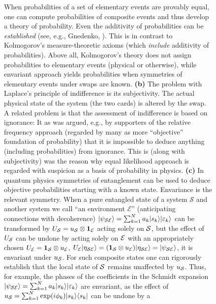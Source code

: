 \documentclass[aps,amsmath,amssymb,amsfonts,floatfix]{revtex4-1}
\newcommand{\cS}        {{\mathcal S}}
\newcommand{\cE}        {{\mathcal E}}
\newcommand{\+}         {\dagger}
\begin{document}
{\begin{figure}[htb]
{When probabilities of a set of elementary events are provably equal, one
can compute probabilities of composite events and thus develop a theory of probability. Even the
additivity of probabilities can be {\it established} (see, e.g., Gnedenko, \cite{32}).
This is in contrast to Kolmogorov's measure-theoretic
axioms (which {\it include} additivity of probabilities). Above all, Kolmogorov's theory does not assign probabilities to elementary events (physical or otherwise), while envariant approach yields probabilities when symmetries of elementary events under swaps are known. 
{\bf (b)} The problem with Laplace's principle of indifference is its subjectivity.
The actual physical state of the system (the two cards) is altered by
the swap.  A related problem is that the assessment of indifference is based on ignorance: It
as was argued, e.g., by supporters of the relative frequency approach (regarded by many as more ``objective'' foundation of probability) that it is impossible to deduce anything 
(including probabilities) from ignorance. This is (along with subjectivity) was the reason why equal likelihood approach
is regarded with suspicion as a basis of probability in physics.
{\bf (c)} In quantum physics symmetries of entanglement can be used to deduce objective
probabilities starting with a known state. Envariance is the relevant symmetry.
When a pure entangled state of a system $\cS$ and another system we call ``an environment $\cE$'' (anticipating connections with decoherence) $
|\psi_{\cal SE}\rangle = \sum_{k=1}^N a_k |s_k\rangle |\varepsilon_k\rangle $ can be transformed
by $U_{\cal S}=u_{\cal S} \otimes {\bf 1}_{\cal E}$ acting solely on ${\cal S}$, but the effect of $U_{\cal S}$ can be undone by acting solely on ${\cal E}$ with an appropriately chosen $U_{\cal E}=
{\bf 1}_{\cal S} \otimes u_{\cal E}$, $U_{\cal E}|\eta_{\cal SE}\rangle  = ({\bf 1}_{\cal S} \otimes
u_{\cal E}) |\eta_{\cal SE}\rangle = |\psi_{\cal SE}\rangle $, it is envariant under $u_{\cal S}$. For such
composite states one can rigorously establish that the local state of ${\cal S}$ remains unaffected by
$u_{\cal S}$. Thus, for example, the phases of the coefficients in the Schmidt expansion
$|\psi_{\cal SE}\rangle = \sum_{k=1}^N a_k |s_k\rangle |\varepsilon_k\rangle $ are envariant, as the effect of $u_{\cal S}=\sum_{k=1}^N \exp(i \phi_k)|s_k\rangle \langle s_k| $ can be undone by a
}
\end{figure}}
\end{document}
